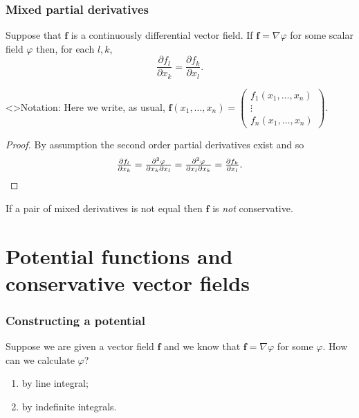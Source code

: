 \documentclass[aspectratio=169,handout]{beamer}
\newcommand{\ff}{\mathbf{f}}
\begin{document}
\begin{frame}
    \frametitle{Mixed partial derivatives}

    \begin{theorem}
        Suppose that \(\ff\) is a continuously differential vector field.
        If \(\ff = \nabla \varphi\) for some scalar field \(\varphi\) then, for each \(l,k\),
        \[
            \frac{\partial f_l}{\partial x_k} = \frac{\partial f_k}{\partial x_l}.
        \]
    \end{theorem}

    \structure<>{Notation:} Here we write, as usual, \(\ff(x_1,\ldots,x_n) = \left(\begin{smallmatrix}
            f_1(x_1,\ldots,x_n)\\
            \vdots \\
            f_n(x_1,\ldots,x_n)
        \end{smallmatrix}\right)\).

    \begin{proof}
        By assumption the second order partial derivatives exist and so
        \[
            \tfrac{\partial f_l}{\partial x_k}
            = \tfrac{\partial^2 \varphi}{\partial x_k \partial x_l}
            = \tfrac{\partial^2 \varphi}{\partial x_l \partial x_k}
            = \tfrac{\partial f_k}{\partial x_l}. \qedhere
        \]
    \end{proof}

    If a pair of mixed derivatives is not equal then \(\ff\) is \emph{not} conservative.

\end{frame}


\section{Potential functions and conservative vector fields}

\begin{frame}
    \frametitle{Constructing a potential}

    Suppose we are given a vector field \(\ff\) and we know that \(\ff = \nabla \varphi\) for some \(\varphi\).
    How can we calculate \(\varphi\)?

    \begin{enumerate}
        \item by line integral;
        \item by indefinite integrals.
    \end{enumerate}





\end{frame}
\end{document}
